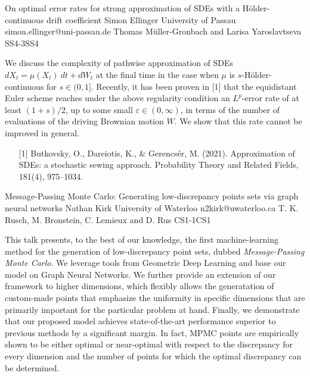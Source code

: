 \begin{talk}
  {On optimal error rates for strong approximation of SDEs with a H\"older-continuous drift coefficient}%
  {Simon Ellinger}%
  {University of Passau}%
  {simon.ellinger@uni-passau.de}%
  {Thomas M\"uller-Gronbach and Larisa Yaroslavtseva}%
{}{}{SS4-3}{SS4}

			
We discuss the complexity of pathwise approximation of SDEs $dX_t = \mu(X_t) \: dt + dW_t$ at the final time in the case when $\mu$ is $s$-H\"older-continuous for $s \in (0,1]$. Recently, it has been proven in [1] that the equidistant Euler scheme reaches under the above regularity condition an $L^p$-error rate of at least $(1+s)/2$, up to some small $\varepsilon \in (0,\infty)$, in terms of the number of evaluations of the driving Brownian motion $W$. We show that this rate cannot be improved in general.

\medskip

\begin{enumerate}
	\item[{[1]}] Butkovsky, O., Dareiotis, K., \& Gerencsér, M. (2021). Approximation of SDEs: a stochastic sewing approach. Probability Theory and Related Fields, 181(4), 975–1034.
\end{enumerate}
\end{talk}

\begin{talk}
  {Message-Passing Monte Carlo: Generating low-discrepancy points sets via graph neural networks}%
  {Nathan Kirk}%
  {University of Waterloo}%
  {n2kirk@uwaterloo.ca}%
  {T. K. Rusch, M. Bronstein, C. Lemieux and D. Rus}%
{}{}{CS1-1}{CS1}

			
This talk presents, to the best of our knowledge, the first machine-learning method for the generation of low-discrepancy point sets, dubbed \textit{Message-Passing Monte Carlo}. We leverage tools from Geometric Deep Learning and base our model on Graph Neural Networks. We further provide an extension of our framework to higher dimensions, which flexibly allows the generatation of custom-made points that emphasize the uniformity in specific dimensions that are primarily important for the particular problem at hand. Finally, we demonstrate that
our proposed model achieves state-of-the-art performance superior to previous methods
by a significant margin. In fact, MPMC points are empirically shown to be either optimal or
near-optimal with respect to the discrepancy for every dimension and the number of points
for which the optimal discrepancy can be determined.


\end{talk}

